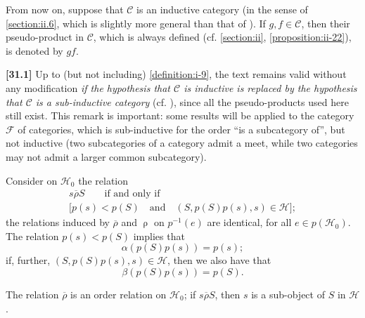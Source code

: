 \documentclass[a4paper,fleqn]{article}
\theoremstyle{plain}
\newenvironment{proposition}[1]
  {\renewcommand\theinnerproposition{#1}\innerproposition}
  {\endinnerproposition}
\theoremstyle{definition}
\newenvironment{longcomm}[1]
  {\noindent\textbf{[#1]}\rmfamily}
  {}
\newcommand{\textand}{\quad\text{and}\quad}
\newcommand{\CC}{\mathcal{C}}
\newcommand{\HH}{\mathcal{H}}
\newcommand{\FF}{\mathcal{F}}
\newcommand{\relrho}{\mathrel{\rho}}
\newcommand{\relrhobar}{\mathrel{\overline{\rho}}}
\begin{document}
From now on, suppose that $\CC$ is an inductive category (in the sense of \cref{section:ii.6}, which is slightly more general than that of \cite{3c}).
If $g,f\in\CC$, then their pseudo-product in $\CC$, which is always defined (cf. \cref{section:ii}, \cref{proposition:ii-22}), is denoted by $gf$.

\begin{longcomm}{31.1}
  Up to (but not including) \cref{definition:i-9}, the text remains valid without any modification \emph{if the hypothesis that $\CC$ is inductive is replaced by the hypothesis that $\CC$ is a sub-inductive category} (cf. \cite{coll69}), since all the pseudo-products used here still exist.
  This remark is important: some results will be applied to the category $\FF$ of categories, which is sub-inductive for the order ``is a subcategory of'', but not inductive (two subcategories of a category admit a meet, while two categories may not admit a larger common subcategory).
\end{longcomm}

Consider on $\HH_0$ the relation
\[
  \begin{gathered}
    s\relrhobar S
    \qquad\text{if and only if}
  \\\big[p(s)<p(S)
    \textand
    (S,p(S)p(s),s)\in\HH\big];
  \end{gathered}
\]
the relations induced by $\relrhobar$ and $\relrho$ on $p^{-1}(e)$ are identical, for all $e\in p(\HH_0)$.
The relation $p(s)<p(S)$ implies that
\[
  \alpha(p(S)p(s))
  = p(s);
\]
if, further, $(S,p(S)p(s),s)\in\HH$, then we also have that
\[
  \beta(p(S)p(s))
  = p(S).
\]

\begin{proposition}{3}
\label{proposition:i-3}
  The relation $\relrhobar$ is an order relation on $\HH_0$;
  if $s\relrhobar S$, then $s$ is a sub-object \cite{5} of $S$ in $\HH$.
\end{proposition}
\end{document}
